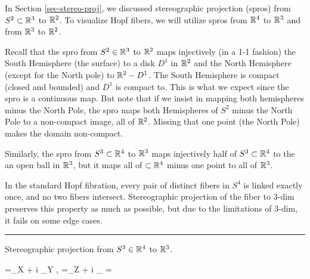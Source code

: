 In Section \ref{sec-stereo-proj},
we discussed stereographic projection (spros) from $S^2\subset { \mathbb{R}}^3$ to ${ \mathbb{R}}^2$.
To visualize Hopf fibers, we will 
utilize spros from
${ \mathbb{R}}^4$ to ${ \mathbb{R}}^3$ and from ${ \mathbb{R}}^3$ to ${ \mathbb{R}}^2$.

{\beq
{}
\eeq}

Recall that the spro from $S^2\in{ \mathbb{R}}^3$ to ${ \mathbb{R}}^2$
maps injectively (in a 1-1 fashion)
the South Hemisphere (the surface) to a disk $D^1$ in ${ \mathbb{R}}^2$ and the North Hemisphere  (except for the
North pole) to  ${ \mathbb{R}}^2 -D^1$.
The South Hemisphere is compact (closed and bounded) and $D^1$ 
is compact to. This is what we expect since the spro is a continuous map. But note that
if we insist in mapping both hemispheres minus the North Pole,
the spro maps both
Hemispheres of $S^2$ minus the North Pole to a non-compact image,
all of ${ \mathbb{R}}^2$. Missing that one point (the North Pole) makes the domain non-compact.

Similarly,
the spro from $S^3\subset{ \mathbb{R}}^4$ to ${ \mathbb{R}}^3$
maps injectively 
half of $S^3\subset { \mathbb{R}}^4$ to the
an open ball in ${ \mathbb{R}}^3$,
but it maps all of $\subset { \mathbb{R}}^4$ minus one point to all of ${ \mathbb{R}}^3$.


In the standard Hopf fibration, every pair of distinct fibers in $S^4$ is linked exactly once, and no two fibers intersect.
Stereographic projection of the fiber to 3-dim preserves this property 
as much as possible, but due to the limitations 
of 3-dim, it fails on some edge cases.

\hrule
Stereographic projection from $S^3\in{ \mathbb{R}}^4$ to ${ \mathbb{R}}^3$.

\beq
\psim =\underbrace{\psimr}_{\lam X} + i \underbrace{\psimi}_{\lam Y}
,\quad
\psip =\underbrace{\psipr}_{\lam Z} + i \underbrace{\psipi}_{}
\quad {}
\lam= 
\eeq

